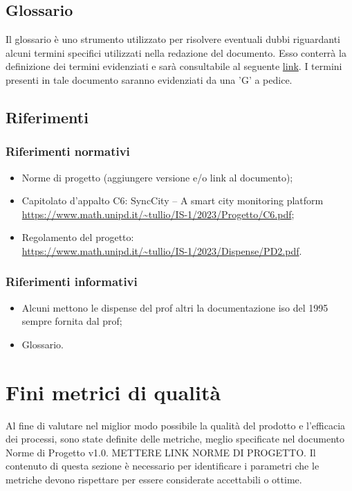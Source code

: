 \documentclass[italian,12pt]{article} %
\begin{document}
\subsection{Glossario}
Il glossario è uno strumento utilizzato per risolvere eventuali dubbi riguardanti 
alcuni termini specifici utilizzati nella redazione del documento.
Esso conterrà la definizione dei termini evidenziati e sarà consultabile al seguente \href{https://7last.github.io/docs/rtb/documentazione-interna/glossario}{link}. I termini presenti in tale documento saranno evidenziati da una 'G' a pedice.

\subsection{Riferimenti}

\subsubsection{Riferimenti normativi}
\begin{itemize}
    \item Norme di progetto (aggiungere versione e/o link al documento);
    \item Capitolato d'appalto C6: SyncCity – A smart city monitoring platform\\
		  \url{https://www.math.unipd.it/~tullio/IS-1/2023/Progetto/C6.pdf};
    \item Regolamento del progetto:\\
		  \url{https://www.math.unipd.it/~tullio/IS-1/2023/Dispense/PD2.pdf}.
\end{itemize}

\subsubsection{Riferimenti informativi}
\begin{itemize}
    \item Alcuni mettono le dispense del prof altri la documentazione iso del 1995 
			sempre fornita dal prof;
    \item Glossario.
\end{itemize}

\section{Fini metrici di qualità}
Al fine di valutare nel miglior modo possibile la qualità del prodotto e l'efficacia dei processi, sono state definite delle metriche, meglio specificate nel documento Norme di Progetto v1.0. METTERE LINK NORME DI PROGETTO. Il contenuto di questa sezione è necessario per identificare i parametri che le metriche devono rispettare per essere considerate accettabili o ottime. 
\end{document}
